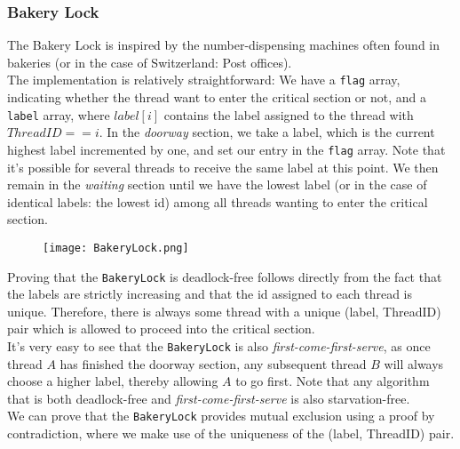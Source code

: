 \documentclass[main]{subfiles}
\begin{document}

\subsubsection{Bakery Lock}
The Bakery Lock is inspired by the number-dispensing machines often found in bakeries (or in the case of Switzerland: Post offices).\\[3mm]
The implementation is relatively straightforward: We have a \texttt{flag} array, indicating whether the thread want to enter the critical section or not, and a \texttt{label} array, where $label[i]$ contains the label assigned to the thread with $ThreadID == i$. In the \textit{doorway} section, we take a label, which is the current highest label incremented by one, and set our entry in the \texttt{flag} array. Note that it's possible for several threads to receive the same label at this point. We then remain in the \textit{waiting} section until we have the lowest label (or in the case of identical labels: the lowest id) among all threads wanting to enter the critical section. 
\begin{figure}[H]
    \centering
    \texttt{[image: BakeryLock.png]}
\end{figure}
\noindent Proving that the \texttt{BakeryLock} is deadlock-free follows directly from the fact that the labels are strictly increasing and that the id assigned to each thread is unique. Therefore, there is always some thread with a unique (label, ThreadID) pair which is allowed to proceed into the critical section.\\[3mm]
It's very easy to see that the \texttt{BakeryLock} is also \textit{first-come-first-serve}, as once thread $A$ has finished the doorway section, any subsequent thread $B$ will always choose a higher label, thereby allowing $A$ to go first. Note that any algorithm that is both deadlock-free and \textit{first-come-first-serve} is also starvation-free.\\[3mm]
We can prove that the \texttt{BakeryLock} provides mutual exclusion      using a proof by contradiction, where we make use of the uniqueness of the (label, ThreadID) pair.
 
\end{document}
